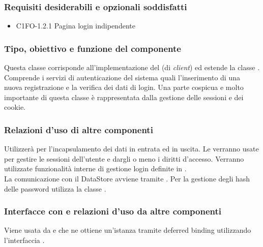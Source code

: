\subsubsection*{Requisiti desiderabili e opzionali soddisfatti}
\begin{itemize}
    \item C1FO-1.2.1 Pagina login indipendente
\end{itemize}
\subsubsection*{Tipo, obiettivo e funzione del componente}
Questa classe corrisponde all'implementazione del  (di
\emph{client}) ed estende la classe . Comprende i
servizi di autenticazione del sistema quali l'inserimento di una nuova
registrazione e la verifica dei dati di login. Una parte cospicua e molto
importante di questa classe \`e rappresentata dalla gestione delle sessioni e
dei cookie. 
\subsubsection*{Relazioni d'uso di altre componenti} Utilizzer\`a 
per l'incapsulamento dei dati in entrata ed in uscita. Le
 verranno
usate per gestire le sessioni dell'utente e dargli o meno i diritti d'accesso.
Verranno utilizzate funzionalit\`a interne di gestione login definite in
. \\ La comunicazione con il DataStore avviene tramite
. Per la gestione degli hash delle password utilizza la classe
. 
\subsubsection*{Interfacce con e relazioni d'uso da altre
componenti} Viene usata da  e  che ne ottiene un'istanza
tramite deferred binding utilizzando l'interfaccia .

